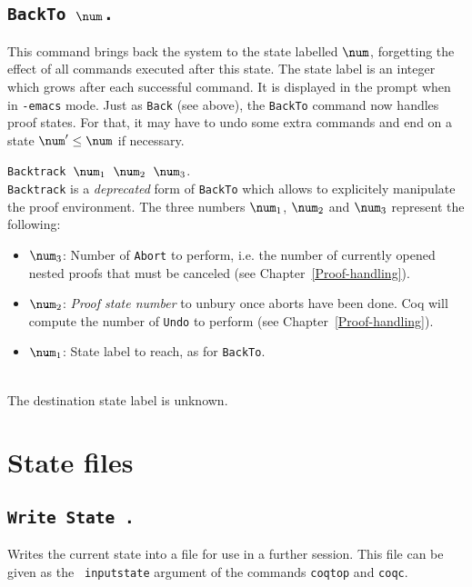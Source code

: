 \subsection[\tt BackTo $\num$.]{\tt BackTo $\num$.}
\label{sec:statenums}

This command brings back the system to the state labelled $\num$,
forgetting the effect of all commands executed after this state.
The state label is an integer which grows after each successful command.
It is displayed in the prompt when in \texttt{-emacs} mode.
Just as {\tt Back} (see above), the {\tt BackTo} command now handles
proof states. For that, it may have to undo some
extra commands and end on a state $\num' \leq \num$ if necessary.

\begin{Variants}
\item {\tt Backtrack $\num_1$ $\num_2$ $\num_3$}.\\
  {\tt Backtrack} is a \emph{deprecated} form of {\tt BackTo} which
  allows to explicitely manipulate the proof environment. The three
  numbers $\num_1$, $\num_2$ and $\num_3$ represent the following:
\begin{itemize}
\item $\num_3$: Number of \texttt{Abort} to perform, i.e. the number
  of currently opened nested proofs that must be canceled (see
  Chapter~\ref{Proof-handling}).
\item $\num_2$: \emph{Proof state number} to unbury once aborts have
  been done. Coq will compute the number of \texttt{Undo} to perform
  (see Chapter~\ref{Proof-handling}).
\item $\num_1$: State label to reach, as for {\tt BackTo}.
\end{itemize}
\end{Variants}

\begin{ErrMsgs}
\item {} \\
  The destination state label is unknown.
\end{ErrMsgs}

\section{State files}

\subsection[\tt Write State \str.]{\tt Write State \str.}
Writes the current state into a file \str{} for
use in a further session. This file can be given as the {\tt
  inputstate} argument of the commands {\tt coqtop} and {\tt coqc}.

